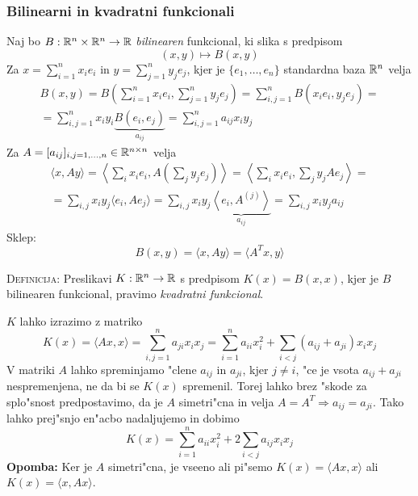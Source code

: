 \subsubsection{Bilinearni in kvadratni funkcionali}
Naj bo $B: \mathbb{R}^n \times \mathbb{R}^n \to \mathbb{R}$ \emph{bilinearen} funkcional, ki slika s predpisom
\begin{equation*}
(x, y) \mapsto B(x, y)
\end{equation*}
Za $x = \sum_{i=1}^n x_i e_i$ in $y = \sum_{j=1}^n y_j e_j$, kjer je $\{ e_1, \ldots, e_n \}$ standardna baza $\mathbb{R}^n$ velja
\begin{multline*}
B(x, y) = B\left( \sum_{i=1}^n x_i e_i, \sum_{j=1}^n y_j e_j \right) = \sum_{i, j = 1}^n B(x_i e_i, y_j e_j) = \\
= \sum_{i,j=1}^n x_i y_i \underbrace{B(e_i, e_j)}_{a_{ij}} = \sum_{i, j = 1}^n a_{ij} x_i y_j
\end{multline*}
Za $A = [a_{ij}]_{i,j=1, \ldots, n} \in \mathbb{R}^{n \times n}$ velja
\begin{multline*}
\langle x, A y \rangle = \left\langle \sum_i x_i e_i, A\left(\sum_j y_j e_j \right) \right\rangle = \left\langle \sum_i x_i e_i, \sum_j y_j A e_j \right\rangle = \\
= \sum_{i,j} x_i y_j \langle e_i, A e_j \rangle = \sum_{i, j} x_i y_j \underbrace{\left\langle e_i, A^{(j)} \right\rangle}_{a_{ij}} = \sum_{i, j} x_i y_j a_{ij}
\end{multline*}
Sklep:
\begin{equation*}
B(x, y) = \langle x, Ay \rangle = \langle A^T x, y \rangle
\end{equation*}

\textsc{Definicija:} Preslikavi $K: \mathbb{R}^n \to \mathbb{R}$ s predpisom $K(x) = B(x, x)$, kjer je $B$ bilinearen funkcional, pravimo \emph{kvadratni funkcional}.

$K$ lahko izrazimo z matriko
\begin{equation*}
K(x) = \langle A x, x \rangle = \sum_{i, j = 1}^n a_{ji} x_i x_j = \sum_{i = 1}^n a_{ii} x_i^2 + \sum_{i < j} (a_{ij} + a_{ji}) x_i x_j
\end{equation*}
V matriki $A$ lahko spreminjamo "clene $a_{ij}$ in $a_{ji}$, kjer $j \neq i$, "ce je vsota $a_{ij} + a_{ji}$ nespremenjena, ne da bi se $K(x)$ spremenil. Torej lahko brez "skode za splo"snost predpostavimo, da je $A$ simetri"cna in velja $A = A^T \Rightarrow a_{ij} = a_{ji}$. Tako lahko prej"snjo en"acbo nadaljujemo in dobimo
\begin{equation*}
K(x) = \sum_{i=1}^n a_{ii} x_i^2 + 2 \sum_{i < j} a_{ij} x_i x_j
\end{equation*}
\textbf{Opomba:} Ker je $A$ simetri"cna, je vseeno ali pi"semo $K(x) = \langle A x, x \rangle$ ali $K(x) = \langle x, A x \rangle$.

